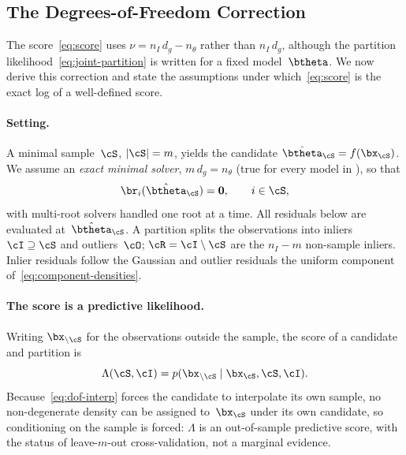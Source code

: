 \subsection{The Degrees-of-Freedom Correction}
\label{sec:supp-dof}

The score~\eqref{eq:score} uses $\nu = n_I\,d_g - n_\theta$ rather
than $n_I\,d_g$, although the partition
likelihood~\eqref{eq:joint-partition} is written for a fixed
model~$\btheta$.  We now derive this correction and state the
assumptions under which~\eqref{eq:score} is the exact log of a
well-defined score.

\paragraph{Setting.}
A minimal sample~$\cS$, $|\cS| = m$, yields the candidate
$\hat\btheta_\cS = f(\bx_\cS)$.  We assume an \emph{exact minimal
solver}, $m\,d_g = n_\theta$ (true for every model in
), so that
\begin{equation}
	\br_i(\hat\btheta_\cS) = \bzero, \qquad i \in \cS,
	\label{eq:dof-interp}
\end{equation}
with multi-root solvers handled one root at a time.  All residuals
below are evaluated at~$\hat\btheta_\cS$.  A partition splits the
observations into inliers $\cI \supseteq \cS$ and outliers~$\cO$;
$\cR = \cI \setminus \cS$ are the $n_I - m$ non-sample inliers.
Inlier residuals follow the Gaussian and outlier residuals the uniform
component of~\eqref{eq:component-densities}.

\paragraph{The score is a predictive likelihood.}
Writing $\bx_{\setminus\cS}$ for the observations outside the sample,
the score of a candidate and partition is
\begin{equation}
	\Lambda(\cS, \cI) = p(\bx_{\setminus\cS} \mid \bx_\cS, \cS, \cI).
	\label{eq:dof-predictive}
\end{equation}
Because~\eqref{eq:dof-interp} forces the candidate to interpolate its
own sample, no non-degenerate density can be assigned to~$\bx_\cS$
under its own candidate, so conditioning on the sample is forced:
$\Lambda$ is an out-of-sample predictive score, with the status of
leave-$m$-out cross-validation, not a marginal evidence.

